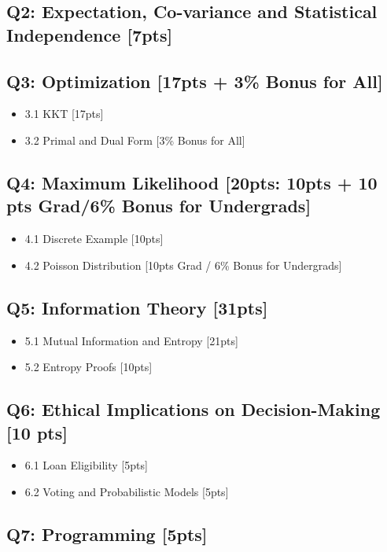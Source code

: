 \documentclass{article}
\begin{document}
\subsection*{Q2: Expectation, Co-variance and Statistical Independence [7pts]}

\subsection*{Q3: Optimization [17pts + 3\% Bonus for All]}
\begin{itemize}
    \item 3.1 KKT [17pts]
    \item 3.2 Primal and Dual Form [3\% Bonus for All]
\end{itemize}

\subsection*{Q4: Maximum Likelihood [20pts: 10pts + 10 pts Grad/6\% Bonus for Undergrads]}
\begin{itemize}
    \item 4.1 Discrete Example [10pts]
    \item 4.2 Poisson Distribution [10pts Grad / 6\% Bonus for Undergrads]
\end{itemize}

\subsection*{Q5: Information Theory [31pts]}
\begin{itemize}
    \item 5.1 Mutual Information and Entropy [21pts]
    \item 5.2 Entropy Proofs [10pts]
\end{itemize}

\subsection*{Q6: Ethical Implications on Decision-Making [10 pts]}
\begin{itemize}
    \item 6.1 Loan Eligibility [5pts]
    \item 6.2 Voting and Probabilistic Models [5pts]
\end{itemize}

\subsection*{Q7: Programming [5pts]}
\end{document}
